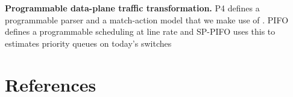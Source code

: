\documentclass[conference]{IEEEtran}
\begin{document}
\textbf{Programmable data-plane traffic transformation.} P4 defines a programmable parser and a match-action model that we make use of \cite{p4ccr2014}. PIFO defines a programmable scheduling at line rate \cite{pifo2016} and SP-PIFO uses this to estimates priority queues on today's switches \cite{sppifo2020} 


\section*{References}


\end{document}
